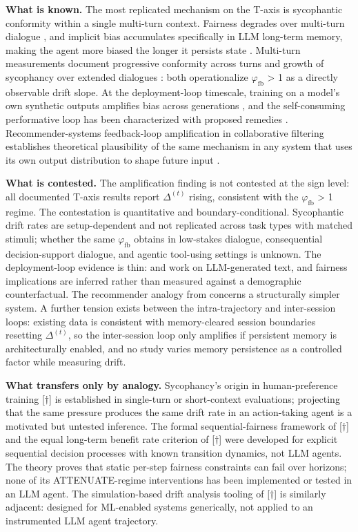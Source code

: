 \documentclass[acmsmall,nonacm]{acmart}
\begin{document}
\textbf{What is known.} The most replicated mechanism on the T-axis is sycophantic conformity within a single multi-turn context. Fairness degrades over multi-turn dialogue \cite{fan2024fairmt}, and implicit bias accumulates specifically in LLM long-term memory, making the agent more biased the longer it persists state \cite{ma2026implicit}. Multi-turn measurements document progressive conformity across turns \cite{liu2025truth} and growth of sycophancy over extended dialogues \cite{hong2025measuring}: both operationalize $\varphi_{\mathrm{fb}}$ > 1 as a directly observable drift slope. At the deployment-loop timescale, training on a model's own synthetic outputs amplifies bias across generations \cite{wyllie2024fairness}, and the self-consuming performative loop has been characterized with proposed remedies \cite{wang2026observations}. Recommender-systems feedback-loop amplification in collaborative filtering establishes theoretical plausibility of the same mechanism in any system that uses its own output distribution to shape future input \cite{mansoury2020feedback}.

\textbf{What is contested.} The amplification finding is not contested at the sign level: all documented T-axis results report $\Delta^{(t)}$ rising, consistent with the $\varphi_{\mathrm{fb}}$ > 1 regime. The contestation is quantitative and boundary-conditional. Sycophantic drift rates are setup-dependent and not replicated across task types with matched stimuli; whether the same $\varphi_{\mathrm{fb}}$ obtains in low-stakes dialogue, consequential decision-support dialogue, and agentic tool-using settings is unknown. The deployment-loop evidence is thin: \cite{wyllie2024fairness} and \cite{wang2026observations} work on LLM-generated text, and fairness implications are inferred rather than measured against a demographic counterfactual. The recommender analogy from \cite{mansoury2020feedback} concerns a structurally simpler system. A further tension exists between the intra-trajectory and inter-session loops: existing data is consistent with memory-cleared session boundaries resetting $\Delta^{(t)}$, so the inter-session loop only amplifies if persistent memory is architecturally enabled, and no study varies memory persistence as a controlled factor while measuring drift.

\textbf{What transfers only by analogy.} Sycophancy's origin in human-preference training \cite{sharma2024understanding}[$\dagger$] is established in single-turn or short-context evaluations; projecting that the same pressure produces the same drift rate in an action-taking agent is a motivated but untested inference. The formal sequential-fairness framework of \cite{hu2022achieving}[$\dagger$] and the equal long-term benefit rate criterion of \cite{xu2024adapting}[$\dagger$] were developed for explicit sequential decision processes with known transition dynamics, not LLM agents. The theory proves that static per-step fairness constraints can fail over horizons; none of its ATTENUATE-regime interventions has been implemented or tested in an LLM agent. The simulation-based drift analysis tooling of \cite{she2025fairsense}[$\dagger$] is similarly adjacent: designed for ML-enabled systems generically, not applied to an instrumented LLM agent trajectory.
\end{document}
